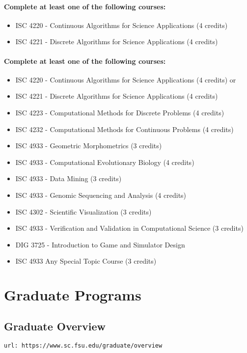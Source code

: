 \documentclass[12pt,a4paper]{article}
\begin{document}
\paragraph{Complete at least \textbf{one} of the following courses:}
\begin{itemize}
    \item ISC 4220 - Continuous Algorithms for Science Applications (4 credits)
    \item ISC 4221 - Discrete Algorithms for Science Applications (4 credits)
\end{itemize}

\paragraph{Complete at least \textbf{one} of the following courses:}
\begin{itemize}
    \item ISC 4220 - Continuous Algorithms for Science Applications (4 credits) or
    \item ISC 4221 - Discrete Algorithms for Science Applications (4 credits)
    \item ISC 4223 - Computational Methods for Discrete Problems (4 credits)
    \item ISC 4232 - Computational Methods for Continuous Problems (4 credits)
    \item ISC 4933 - Geometric Morphometrics (3 credits)
    \item ISC 4933 - Computational Evolutionary Biology (4 credits)
    \item ISC 4933 - Data Mining (3 credits)
    \item ISC 4933 - Genomic Sequencing and Analysis (4 credits)
    \item ISC 4302 - Scientific Visualization (3 credits)
    \item ISC 4933 - Verification and Validation in Computational Science (3 credits)
    \item DIG 3725 - Introduction to Game and Simulator Design
    \item ISC 4933 Any Special Topic Course (3 credits)
\end{itemize}

\section{Graduate Programs}

\subsection{Graduate Overview}
\texttt{url: https://www.sc.fsu.edu/graduate/overview}
\end{document}
